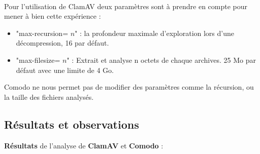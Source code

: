 \documentclass[smallextended]{svjour3}       %
\begin{document}
$ $\\
\\
Pour l'utilisation de ClamAV deux paramètres sont à prendre en compte pour mener à bien cette expérience :
\begin{itemize}
\item "max-recursion= $n$" : la profondeur maximale d'exploration lors d'une décompression, 16 par défaut.
\item "max-filesize= $n$" : Extrait et analyse  n octets de chaque archives. 25 Mo par défaut avec une limite de 4 Go.
\end{itemize}
Comodo ne nous permet pas de modifier des paramètres comme la récursion, ou la taille des fichiers analysés.\\

\subsection{Résultats et observations}
\label{3.2résultats}
\textbf{Résultats} de l'analyse de \textbf{ClamAV} et \textbf{Comodo} :\\
$ $\\
\end{document}
